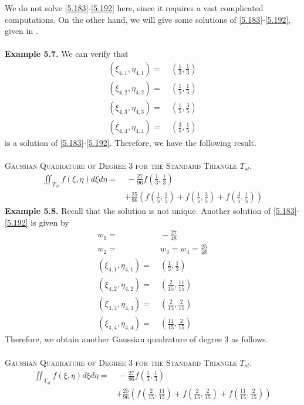 \documentclass[a4paper]{article}
\numberwithin{equation}{section}
\begin{document}
We do not solve \eqref{5.183}-\eqref{5.192} here, since it requires a vast complicated computations. On the other hand, we will give some solutions of \eqref{5.183}-\eqref{5.192}, given in \cite{7}.\\
\\
\textbf{Example 5.7.} We can verify that
\begin{align}
\left( {{\xi _{4,1}},{\eta _{4,1}}} \right) =&\ \left( {\frac{1}{3},\frac{1}{3}} \right)\\
\left( {{\xi _{4,2}},{\eta _{4,2}}} \right) =&\ \left( {\frac{1}{5},\frac{1}{5}} \right)\\
\left( {{\xi _{4,3}},{\eta _{4,3}}} \right) =&\ \left( {\frac{1}{5},\frac{3}{5}} \right)\\
\left( {{\xi _{4,4}},{\eta _{4,4}}} \right) =&\ \left( {\frac{3}{5},\frac{1}{5}} \right)
\end{align}
is a solution of \eqref{5.183}-\eqref{5.192}. Therefore, we have the following result.\\
\\
\textsc{Gaussian Quadrature of Degree 3 for the Standard Triangle $T_{st}$.}
\begin{align}
\iint_{{T_{st}}} {f\left( {\xi ,\eta } \right)d\xi d\eta } =&\  - \frac{{27}}{{96}}f\left( {\frac{1}{3},\frac{1}{3}} \right)\\
  &  + \frac{{25}}{{96}}\left( {f\left( {\frac{1}{5},\frac{1}{5}} \right) + f\left( {\frac{1}{5},\frac{3}{5}} \right) + f\left( {\frac{3}{5},\frac{1}{5}} \right)} \right) 
\end{align}
\textbf{Example 5.8.} Recall that the solution is not unique. Another solution of \eqref{5.183}-\eqref{5.192} is given by
\begin{align}
{w_1} =&\  - \frac{{27}}{{48}}\\
{w_2} =&\ {w_3} = {w_4} = \frac{{25}}{{48}}\\
\left( {{\xi _{4,1}},{\eta _{4,1}}} \right) =&\ \left( {\frac{1}{3},\frac{1}{3}} \right)\\
\left( {{\xi _{4,2}},{\eta _{4,2}}} \right) =&\ \left( {\frac{2}{{15}},\frac{{11}}{{15}}} \right)\\
\left( {{\xi _{4,3}},{\eta _{4,3}}} \right) =&\ \left( {\frac{2}{{15}},\frac{2}{{15}}} \right)\\
\left( {{\xi _{4,4}},{\eta _{4,4}}} \right) =&\ \left( {\frac{{11}}{{15}},\frac{2}{{15}}} \right)
\end{align}
Therefore, we obtain another Gaussian quadrature of degree 3 as follows.\\
\\
\textsc{Gaussian Quadrature of Degree 3 for the Standard Triangle $T_{st}$.} 
\begin{align}
\iint_{{T_{st}}} {f\left( {\xi ,\eta } \right)d\xi d\eta } =&\  - \frac{{27}}{{96}}f\left( {\frac{1}{3},\frac{1}{3}} \right)\\
  &  + \frac{{25}}{{96}}\left( {f\left( {\frac{2}{{15}},\frac{{11}}{{15}}} \right) + f\left( {\frac{2}{{15}},\frac{2}{{15}}} \right) + f\left( {\frac{{11}}{{15}},\frac{2}{{15}}} \right)} \right) 
\end{align}
\end{document}
